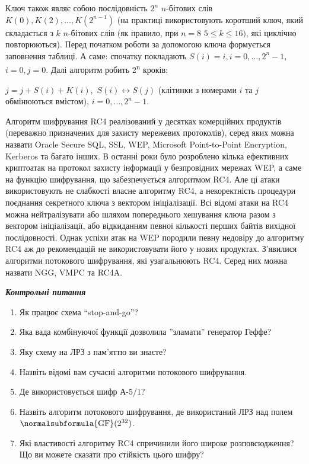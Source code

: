Ключ також  являє собою послідовність  ${2^{{n}}}$   ${n}${}-бітових слів 
${K(0),K(2),\dots,K(2^{{n-1}})}$ (на практиці використовують
коротший ключ, який складається з  ${k}$ ${n}${}-бітових слів (як правило, при 
${n=8}$  ${5\le k\le \text{16})}$, які циклічно повторюються). Перед початком
роботи за допомогою ключа формується заповнення таблиці. А саме: спочатку
покладають  ${S(i)=i,i=0,\dots,2^{{n}}-1,}$  ${i=0,j=0}$.
Далі алгоритм робить 2\textsuperscript{n} кроків: 

 ${j=j+S(i)+K(i),}$   ${S(i)\leftrightarrow S(j)}$ (клітинки з номерами  ${i}$
та  ${j}$ обмінюються вмістом),  ${i=0,\dots,2^{{n}}-1}$.

Алгоритм шифрування RC4 реалізований у  десятках комерційних продуктів
(переважно призначених для захисту мережевих протоколів), серед яких можна
назвати Oracle Secure SQL, SSL, WEP, Microsoft Point{}-to{}-Point Encryption,
Kerberos та багато інших. В останні роки було розроблено кілька ефективних
криптоатак на протокол захисту інформації у безпровідних мережах WEP, а саме на
функцію шифрування, що забезпечується алгоритмом RC4. Але ці атаки
використовують не слабкості власне  алгоритму RC4, а  некоректність процедури
поєднання секретного ключа з вектором  ініціалізації. Всі відомі атаки на RC4
можна нейтралізувати або шляхом попереднього хешування ключа разом з вектором
ініціалізації, або відкиданням певної кількості перших байтів вихідної
послідовності. Однак успіхи атак на  WEP породили певну недовіру до алгоритму
RC4 аж до рекомендацій не використовувати його у нових продуктах. З’явилися
алгоритми потокового шифрування, які узагальнюють  RC4. Серед них можна назвати
NGG, VMPC та RC4A.  


\bigskip


\bigskip


\bigskip


\bigskip

{\centering\bfseries\itshape
Контрольні питання
\par}


\bigskip


\bigskip

\liststyleWWviiiNumxxiv
\begin{enumerate}
\item Як працює схема “stop{}-and{}-go”?
\item Яка вада комбінуючої функції дозволила ”зламати” генератор Геффе?
\item Яку схему на ЛРЗ з пам’яттю ви знаєте?
\item Назвіть відомі вам сучасні алгоритми потокового шифрування.
\item Де використовується шифр А-5/1?
\item Назвіть алгоритм потокового шифрування, де використаний ЛРЗ над полем 
${\normalsubformula{\text{GF}}(2^{{\text{32}}})}$.
\item Які властивості алгоритму RC4 спричинили його широке розповсюдження? Що ви
можете сказати про стійкість цього шифру?
\end{enumerate}

